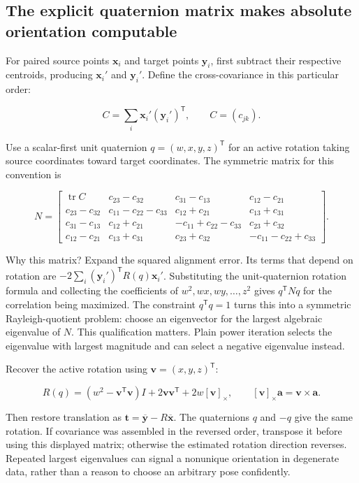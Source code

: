 \subsection{The explicit quaternion matrix makes absolute orientation computable}\label{04-visual-computing-ii-ch032-the-explicit-quaternion-matrix-makes-absolute-orientation-computable}

For paired source points \(\mathbf x_i\) and target points \(\mathbf y_i\), first subtract their respective centroids, producing \(\mathbf x_i'\) and \(\mathbf y_i'\). Define the cross-covariance in this particular order:

\[
C=\sum_i\mathbf x_i'(\mathbf y_i')^{\mathsf T},\qquad C=(c_{jk}).
\]

Use a scalar-first unit quaternion \(q=(w,x,y,z)^{\mathsf T}\) for an active rotation taking source coordinates toward target coordinates. The symmetric matrix for this convention is

\[
N=\begin{bmatrix}
\operatorname{tr}C&c_{23}-c_{32}&c_{31}-c_{13}&c_{12}-c_{21}\\
c_{23}-c_{32}&c_{11}-c_{22}-c_{33}&c_{12}+c_{21}&c_{13}+c_{31}\\
c_{31}-c_{13}&c_{12}+c_{21}&-c_{11}+c_{22}-c_{33}&c_{23}+c_{32}\\
c_{12}-c_{21}&c_{13}+c_{31}&c_{23}+c_{32}&-c_{11}-c_{22}+c_{33}
\end{bmatrix}.
\]

Why this matrix? Expand the squared alignment error. Its terms that depend on rotation are \(-2\sum_i(\mathbf y_i')^{\mathsf T}R(q)\mathbf x_i'\). Substituting the unit-quaternion rotation formula and collecting the coefficients of \(w^2,wx,wy,\ldots,z^2\) gives \(q^{\mathsf T}Nq\) for the correlation being maximized. The constraint \(q^{\mathsf T}q=1\) turns this into a symmetric Rayleigh-quotient problem: choose an eigenvector for the largest algebraic eigenvalue of \(N\). This qualification matters. Plain power iteration selects the eigenvalue with largest magnitude and can select a negative eigenvalue instead.

Recover the active rotation using \(\mathbf v=(x,y,z)^{\mathsf T}\):

\[
R(q)=(w^2-\mathbf v^{\mathsf T}\mathbf v)I+2\mathbf v\mathbf v^{\mathsf T}+2w[\mathbf v]_\times,
\qquad [\mathbf v]_\times\mathbf a=\mathbf v\times\mathbf a.
\]

Then restore translation as \(\mathbf t=\overline{\mathbf y}-R\overline{\mathbf x}\). The quaternions \(q\) and \(-q\) give the same rotation. If covariance was assembled in the reversed order, transpose it before using this displayed matrix; otherwise the estimated rotation direction reverses. Repeated largest eigenvalues can signal a nonunique orientation in degenerate data, rather than a reason to choose an arbitrary pose confidently.


